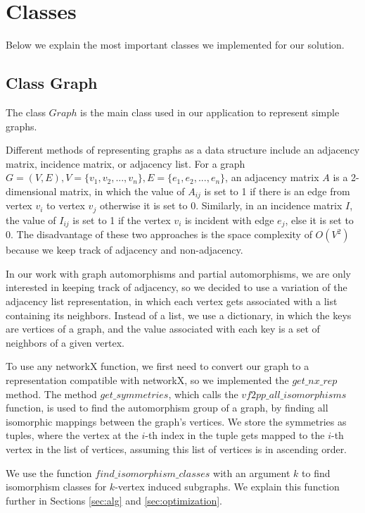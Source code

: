 \section{Classes}

Below we explain the most important classes we implemented for our solution.

\subsection{Class Graph}
The class $Graph$ is the main class used in our application to represent simple graphs.

Different methods of representing graphs as a data structure include an adjacency matrix, incidence matrix, or adjacency list. For a graph $G = (V, E), V = \{v_1, v_2, . . . , v_n\}, E = \{ e_1, e_2, . . . , e_n \}$, an adjacency matrix $A$ is a 2-dimensional matrix, in which the value of $A_{ij}$ is set to 1 if there is an edge from vertex $v_i$ to vertex $v_j$ otherwise it is set to 0. Similarly, in an incidence matrix $I$, the value of $I_{ij}$ is set to 1 if the vertex $v_i$ is incident with edge $e_j$, else it is set to 0. The disadvantage of these two approaches is the space complexity of $O(V^2)$ because we keep track of adjacency and non-adjacency.

In our work with graph automorphisms and partial automorphisms, we are only interested in keeping track of adjacency, so we decided to use a variation of the adjacency list representation, in which each vertex gets associated with a list containing its neighbors. Instead of a list, we use a dictionary, in which the keys are vertices of a graph, and the value associated with each key is a set of neighbors of a given vertex.

To use any networkX function, we first need to convert our graph to a representation compatible with networkX, so we implemented the $get\_nx\_rep$ method. The method $get\_symmetries$, which calls the $vf2pp\_all\_isomorphisms$ function, is used to find the automorphism group of a graph, by finding all isomorphic mappings between the graph's vertices. We store the symmetries as tuples, where the vertex at the $i$-th index in the tuple gets mapped to the $i$-th vertex in the list of vertices, assuming this list of vertices is in ascending order.

We use the function $find\_isomorphism\_classes$ with an argument $k$ to find isomorphism classes for $k$-vertex induced subgraphs. We explain this function further in Sections \ref{sec:alg} and \ref{sec:optimization}.

